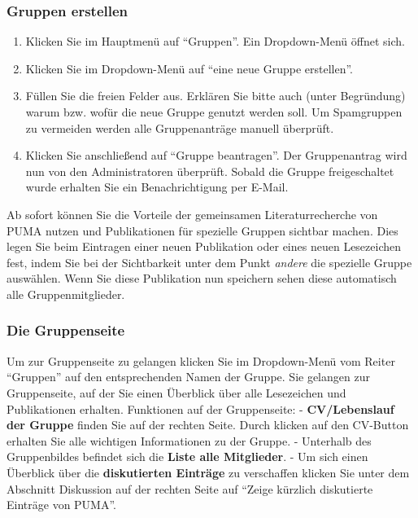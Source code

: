 \subsubsection{Gruppen erstellen}
\begin{enumerate}
    \item Klicken Sie im Hauptmenü auf \enquote{Gruppen}. Ein Dropdown-Menü öffnet sich.
    \item Klicken Sie im Dropdown-Menü auf \enquote{eine neue Gruppe erstellen}.
    \item Füllen Sie die freien Felder aus. Erklären Sie bitte auch (unter Begründung) warum bzw. wofür die neue Gruppe genutzt werden soll.   Um Spamgruppen zu vermeiden werden alle Gruppenanträge manuell überprüft. 
    \item Klicken Sie anschließend auf \enquote{Gruppe beantragen}. Der Gruppenantrag wird nun von den Administratoren überprüft. Sobald die Gruppe freigeschaltet wurde erhalten Sie ein Benachrichtigung per E-Mail.
\end{enumerate}
Ab sofort können Sie die Vorteile der gemeinsamen Literaturrecherche von PUMA nutzen und Publikationen  für spezielle Gruppen sichtbar machen. Dies legen Sie beim Eintragen einer neuen Publikation oder eines neuen Lesezeichen fest, indem Sie bei der Sichtbarkeit unter dem Punkt \textit{andere} die spezielle Gruppe auswählen. Wenn Sie diese Publikation nun speichern sehen diese automatisch alle Gruppenmitglieder.
\subsubsection{Die Gruppenseite}
Um zur Gruppenseite zu gelangen klicken Sie im Dropdown-Menü vom Reiter  \enquote{Gruppen} auf den entsprechenden Namen der Gruppe. Sie gelangen zur Gruppenseite, auf der Sie einen Überblick über alle Lesezeichen und Publikationen erhalten.%
\newline\newline
Funktionen auf der Gruppenseite:\newline\newline
- \textbf{CV/Lebenslauf der Gruppe} finden Sie auf der rechten Seite. Durch klicken auf den CV-Button erhalten Sie alle wichtigen Informationen zu der Gruppe. \newline \newline - Unterhalb des Gruppenbildes befindet sich die \textbf{Liste alle Mitglieder}. \newline \newline - Um sich einen Überblick über die \textbf{diskutierten Einträge} zu verschaffen klicken Sie unter dem Abschnitt Diskussion auf der rechten Seite auf \enquote{Zeige kürzlich diskutierte Einträge von PUMA}.  
